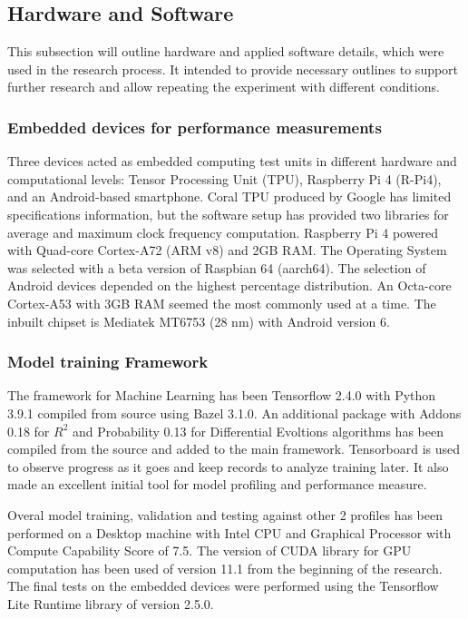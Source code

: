\subsection{Hardware and Software} \label{subsec:soft}
This subsection will outline hardware and applied software details, which were used in the research process.
It intended to provide necessary outlines to support further research and allow repeating the experiment with different conditions.

%
%
\subsubsection{Embedded devices for performance measurements}
Three devices acted as embedded computing test units in different hardware and computational levels: Tensor Processing Unit (TPU), Raspberry Pi 4 (R-Pi4), and an Android-based smartphone.
Coral TPU produced by Google has limited specifications information, but the software setup has provided two libraries for average and maximum clock frequency computation.
Raspberry Pi 4 powered with Quad-core Cortex-A72 (ARM v8) and 2GB RAM.
The Operating System was selected with a beta version of Raspbian 64 (aarch64).
The selection of Android devices depended on the highest percentage distribution.
An Octa-core Cortex-A53 with 3GB RAM seemed the most commonly used at a time.
The inbuilt chipset is Mediatek MT6753 (28 nm) with Android version 6.

%
%
\subsubsection{Model training Framework}
The framework for Machine Learning has been Tensorflow 2.4.0 with Python 3.9.1 compiled from source using Bazel 3.1.0.
An additional package with Addons 0.18 for $R^2$ and Probability 0.13 for Differential Evoltions algorithms has been compiled from the source and added to the main framework.
Tensorboard is used to observe progress as it goes and keep records to analyze training later. It also made an excellent initial tool for model profiling and performance measure.

%
%
Overal model training, validation and testing against other 2 profiles has been performed on a Desktop machine with Intel CPU and Graphical Processor with Compute Capability Score of 7.5. The version of CUDA library for GPU computation has been used of version 11.1 from the beginning of the research.
The final tests on the embedded devices were performed using the Tensorflow Lite Runtime library of version 2.5.0.
%

